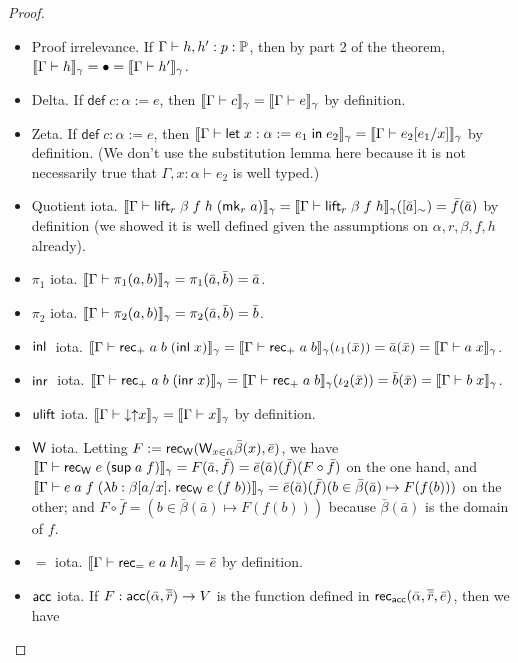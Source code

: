 \begin{proof}
\begin{itemize}
\item Proof irrelevance. If $\Gamma\vdash h,h':p:\P$, then by part 2 of the theorem, $\scott{\Gamma\vdash h}_\gamma=\bullet=\scott{\Gamma\vdash h'}_\gamma$.
\item Delta. If $\mathsf{def}\;c:\alpha:=e$, then $\scott{\Gamma\vdash c}_\gamma=\scott{\Gamma\vdash e}_\gamma$ by definition.
\item Zeta. If $\mathsf{def}\;c:\alpha:=e$, then $\scott{\Gamma\vdash\elet{x:\alpha:=e_1}{e_2}}_\gamma=\scott{\Gamma\vdash e_2[e_1/x]}_\gamma$ by definition. (We don't use the substitution lemma here because it is not necessarily true that $\Gamma,x:\alpha\vdash e_2$ is well typed.)
\item Quotient iota. $\scott{\Gamma\vdash \lift_r\;\beta\;f\;h\;(\mk_r\;a)}_\gamma=\scott{\Gamma\vdash \lift_r\;\beta\;f\;h}_\gamma([\bar a]_{\sim})=\bar f(\bar a)$ by definition (we showed it is well defined given the assumptions on $\alpha,r,\beta,f,h$ already).
\item $\pi_1$ iota. $\scott{\Gamma\vdash\pi_1(a,b)}_\gamma=\pi_1(\bar a,\bar b)=\bar a$.
\item $\pi_2$ iota. $\scott{\Gamma\vdash\pi_2(a,b)}_\gamma=\pi_2(\bar a,\bar b)=\bar b$.
\item $\mathsf{inl}\;$ iota. $\scott{\Gamma\vdash\rec_+\;a\;b\;(\inl x)}_\gamma=\scott{\Gamma\vdash\rec_+\;a\;b}_\gamma(\iota_1(\bar x))=\bar a(\bar x)=\scott{\Gamma\vdash a\;x}_\gamma$.
\item $\mathsf{inr}\;$ iota. $\scott{\Gamma\vdash\rec_+\;a\;b\;(\inr x)}_\gamma=\scott{\Gamma\vdash\rec_+\;a\;b}_\gamma(\iota_2(\bar x))=\bar b(\bar x)=\scott{\Gamma\vdash b\;x}_\gamma$.
\item $\mathsf{ulift}$ iota. $\scott{\Gamma\vdash{\downarrow\uparrow}x}_\gamma=\scott{\Gamma\vdash x}_\gamma$ by definition.
\item $\mathsf{W}$ iota. Letting $F:=\mathsf{rec}_{\mathsf{W}}(\mathsf{W}_{x\in\bar\alpha}\bar\beta(x),\bar e)$, we have $\scott{\Gamma\vdash\rec_\W\;e\;(\sup a\;f)}_\gamma=F(\bar a,\bar f)=\bar e(\bar a)(\bar f)(F\circ \bar f)$ on the one hand, and $\scott{\Gamma\vdash e\;a\;f\;(\lambda b:\beta[a/x].\;\rec_\W\;e\;(f\;b))}_\gamma=\bar e(\bar a)(\bar f)(b\in\bar\beta(\bar a)\mapsto F(f(b)))$ on the other; and $F\circ \bar f=(b\in\bar\beta(\bar a)\mapsto F(f(b)))$ because $\bar\beta(\bar a)$ is the domain of $f$.
\item $=$ iota. $\scott{\Gamma\vdash\rec_=\;e\;a\;h}_\gamma=\bar e$ by definition.
\item $\mathsf{acc}$ iota. If $F:\mathsf{acc}(\bar\alpha,\overline{\bar r})\to V$ is the function defined in $\mathsf{rec}_{\mathsf{acc}}(\bar\alpha,\overline{\bar r},\bar e)$, then we have

\end{itemize}
\end{proof}
